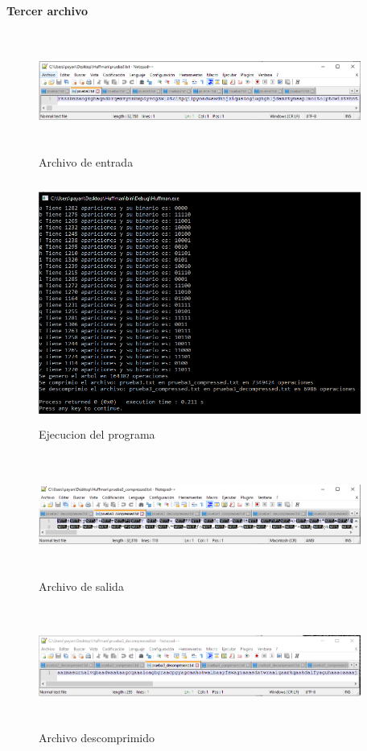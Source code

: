 \documentclass[spanish]{article}
\begin{document}
	\textbf{Tercer archivo}
	\begin{figure}[H]
		\centering
		\includegraphics[width=400px,height=150px]{captura21}
		\caption{Archivo de entrada}
	\end{figure}
	\begin{figure}[H]
		\centering
		\includegraphics[width=400px,height=300px]{captura22}
		\caption{Ejecucion del programa}
	\end{figure}
	\begin{figure}[H]
		\centering
		\includegraphics[width=400px,height=150px]{captura23}
		\caption{Archivo de salida}
	\end{figure}
	\begin{figure}[H]
		\centering
		\includegraphics[width=400px,height=150px]{captura24}
		\caption{Archivo descomprimido}
	\end{figure}
\end{document}
